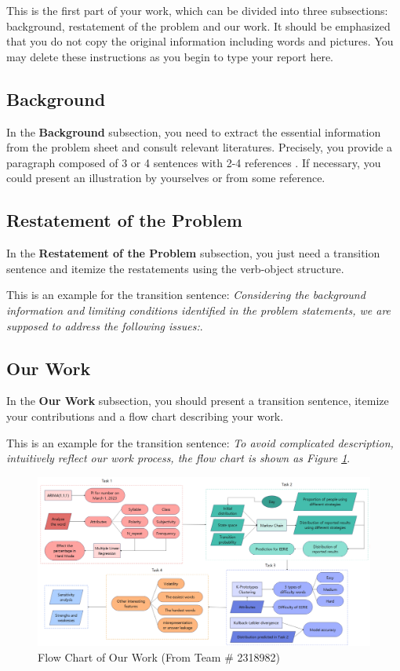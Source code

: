 \documentclass[12pt]{article}  %
\begin{document}
 This is the first part of your work, which can be divided into three subsections: background, restatement of the problem and our work. It should be emphasized that you do not copy the original information including words and pictures. You may delete these instructions as you begin to type your report here.
 
 \subsection{Background}
 
 In the \textbf{Background} subsection, you need to extract the essential information from the problem sheet and consult relevant literatures.  Precisely, you provide a paragraph composed of 3 or 4 sentences with 2-4 references \cite{NDZY2021,V2020}. If necessary, you could present an illustration by yourselves or from some reference.  
 
 
 \subsection{Restatement of the Problem}
 
 In the \textbf{Restatement of the Problem} subsection, you just need a transition sentence and itemize the restatements using the 
 verb-object structure. 
 
 This is an example for the transition sentence: \textit{Considering the background information and limiting conditions identified in the problem statements, we are supposed to address the following issues:}. 
 
 \subsection{Our Work}
 
 In the \textbf{Our Work} subsection, you should present a transition sentence, itemize your contributions and a flow chart describing your work. 
 
 This is an example for the transition sentence:  \textit{To avoid complicated description, intuitively reflect our work process, the flow chart is shown as Figure \ref{fig1}}.
  
 
 
 \begin{figure}[htbp]  %
 
 \centering  %
 \includegraphics[width=.9\textwidth]{Flow_Chart.png} %
 \caption{Flow Chart of Our Work (From Team \# 2318982)} %
 \label{fig1}%
 \end{figure}
 
\end{document}
